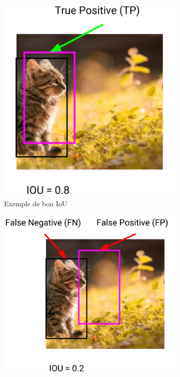 \begin{figure}[H]
    \centering
    \begin{subfigure}[b]{0.39\textwidth}
        \centering
        \includegraphics[width=\textwidth]{03-tail//A1_fondamentaux_ML//A1_figures/A1_32_iou_exemple1.png}
        \caption{Exemple de bon IoU \cite{mechea_panoptic_2019}}
        \label{fig:A1_32_iou_exemple1}
    \end{subfigure}
    \hfill
    \begin{subfigure}[b]{0.48\textwidth}
        \centering
        \includegraphics[width=\textwidth]{03-tail//A1_fondamentaux_ML//A1_figures/A1_33_iou_exemple2.png}

\end{subfigure}
\end{figure}
